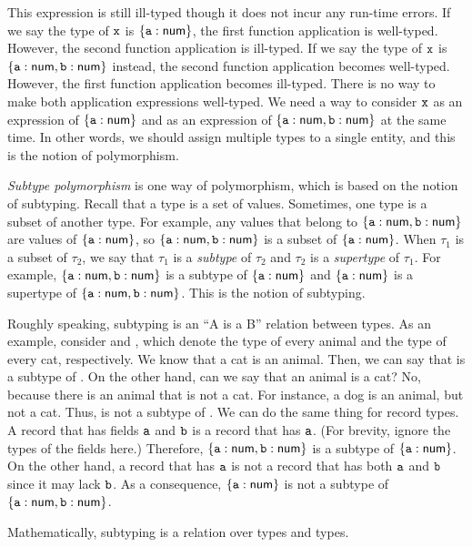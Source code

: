 This expression is still ill-typed though it does not incur any run-time errors.
If we say the type of $\texttt{x}$ is ${\{\texttt{a}:\textsf{num}\}}$, the first function application
is well-typed. However, the second function application is ill-typed. If we say
the type of $\texttt{x}$ is $\{\texttt{a}:\textsf{num},\texttt{b}:\textsf{num}\}$ instead, the second function application
becomes well-typed. However, the first function application becomes ill-typed. There is no
way to make both application expressions well-typed. We need a way to consider
$\texttt{x}$ as an expression of ${\{\texttt{a}:\textsf{num}\}}$ and as an expression of
$\{\texttt{a}:\textsf{num},\texttt{b}:\textsf{num}\}$ at the same time. In other words, we should assign
multiple types to a single entity, and this is the notion of polymorphism.

\textit{Subtype polymorphism} is one way of
polymorphism, which is based on the notion of subtyping. Recall that a
type is a set of values. Sometimes, one type is a subset of another type. For
example, any values that belong to $\{\texttt{a}:\textsf{num},\texttt{b}:\textsf{num}\}$ are values of
${\{\texttt{a}:\textsf{num}\}}$, so $\{\texttt{a}:\textsf{num},\texttt{b}:\textsf{num}\}$ is a subset of
${\{\texttt{a}:\textsf{num}\}}$. When $\tau_1$ is a subset of $\tau_2$,
we say that $\tau_1$ is a \textit{subtype} of $\tau_2$ and
$\tau_2$ is a \textit{supertype} of $\tau_1$.
For example, $\{\texttt{a}:\textsf{num},\texttt{b}:\textsf{num}\}$ is a subtype of ${\{\texttt{a}:\textsf{num}\}}$ and
$\{\texttt{a}:\textsf{num}\}$ is a supertype of ${\{\texttt{a}:\textsf{num},\texttt{b}:\textsf{num}\}}$.
This is the notion of subtyping.

Roughly speaking, subtyping is an ``A is a B'' relation between types. As an example,
consider  and , which denote the type of every animal
and the type of every cat, respectively. We know that a cat is an animal. Then,
we can say that  is a subtype of . On the other hand, can
we say that an animal is a cat? No, because there is an animal that is not a
cat. For instance, a dog is an animal, but not a cat. Thus,  is not
a subtype of . We can do the same thing for record types. A record
that has fields $\texttt{a}$ and $\texttt{b}$ is a record that has $\texttt{a}$. (For brevity,
ignore the types of the fields here.) Therefore, $\{\texttt{a}:\textsf{num},\texttt{b}:\textsf{num}\}$ is a
subtype of ${\{\texttt{a}:\textsf{num}\}}$. On the other hand, a record that has $\texttt{a}$ is not
a record that has both $\texttt{a}$ and $\texttt{b}$ since it may lack $\texttt{b}$. As a consequence,
${\{\texttt{a}:\textsf{num}\}}$ is not a subtype of $\{\texttt{a}:\textsf{num},\texttt{b}:\textsf{num}\}$.

Mathematically, subtyping is a relation over types and types.

